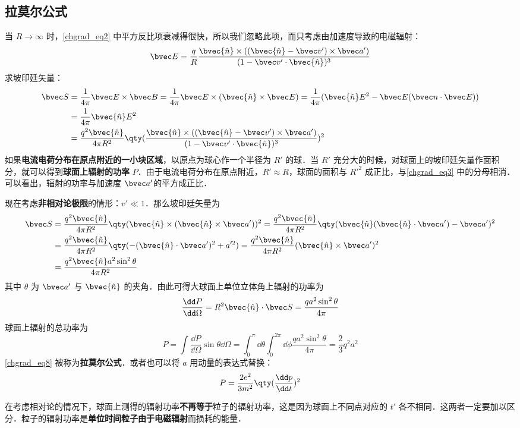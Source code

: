 \subsection{拉莫尔公式}
当 $R\rightarrow \infty$ 时，\autoref{chgrad_eq2} 中平方反比项衰减得很快，所以我们忽略此项，而只考虑由加速度导致的电磁辐射：
\begin{equation}
\bvec E=\frac{q}{R}\frac{\bvec{\hat n}\times ((\bvec{\hat n}-\bvec v')\times \bvec a')}{(1-\bvec v'\cdot \bvec{\hat n})^3}
\end{equation}
求坡印廷矢量：
\begin{equation}\label{chgrad_eq3}
\begin{aligned}
\bvec S&=\frac{1}{4\pi}\bvec E\times \bvec B=\frac{1}{4\pi}\bvec E\times (\bvec{\hat n}\times \bvec E)=\frac{1}{4\pi}(\bvec{\hat n}E^2-\bvec E(\bvec n\cdot \bvec E))\\
&=\frac{1}{4\pi}\bvec {\hat n}E^2\\
&=\frac{q^2\bvec{\hat n}}{4\pi R^2}\qty(\frac{\bvec{\hat n}\times ((\bvec{\hat n}-\bvec v')\times \bvec a')}{(1-\bvec v'\cdot \bvec{\hat n})^3})^2
\end{aligned}
\end{equation}
如果\textbf{电流电荷分布在原点附近的一小块区域}，以原点为球心作一个半径为 $R'$ 的球．当 $R'$ 充分大的时候，对球面上的坡印廷矢量作面积分，就可以得到\textbf{球面上辐射的功率} $P$．由于电流电荷分布在原点附近，$R'\approx R$，球面的面积与 $R'^2$ 成正比，与\autoref{chgrad_eq3} 中的分母相消．可以看出，辐射的功率与加速度 $\bvec a'$的平方成正比．

现在考虑\textbf{非相对论极限}的情形：$v'\ll 1$．那么坡印廷矢量为
\begin{equation}
\begin{aligned}
\bvec S&=\frac{q^2\bvec{\hat n}}{4\pi R^2}\qty(\bvec{\hat n}\times (\bvec{\hat n}\times \bvec a'))^2=\frac{q^2\bvec{\hat n}}{4\pi R^2}\qty(\bvec {\hat n}(\bvec{\hat n}\cdot \bvec a')-\bvec a')^2\\
&=\frac{q^2\bvec{\hat n}}{4\pi R^2}\qty( -(\bvec{\hat n}\cdot \bvec a')^2+a'^2 )=\frac{q^2\bvec{\hat n}}{4\pi R^2}(\bvec{\hat n}\times \bvec a')^2\\
&=\frac{q^2\bvec{\hat n}a^2\sin^2\theta}{4\pi R^2}
\end{aligned}
\end{equation}
其中 $\theta$ 为 $\bvec a'$ 与 $\bvec{\hat n}$ 的夹角．由此可得大球面上单位立体角上辐射的功率为
\begin{equation}
\frac{\dd P}{\dd \Omega}=R^2\bvec{\hat n}\cdot \bvec S=\frac{qa^2\sin^2\theta}{4\pi}
\end{equation}
球面上辐射的总功率为
\begin{equation}\label{chgrad_eq8}
P=\int \frac{\dd P}{\dd \Omega} \sin \theta\dd \Omega=\int_0^\pi\dd \theta\int_0^{2\pi} \dd \phi \frac{qa^2\sin^2\theta}{4\pi}=\frac{2}{3}q^2a^2
\end{equation}
\autoref{chgrad_eq8} 被称为\textbf{拉莫尔公式}．或者也可以将 $a$ 用动量的表达式替换：
\begin{equation}
P=\frac{2e^2}{3m^2}\qty(\frac{\dd p}{\dd t})^2
\end{equation}

在考虑相对论的情况下，球面上测得的辐射功率\textbf{不再等于}粒子的辐射功率，这是因为球面上不同点对应的 $t'$ 各不相同．这两者一定要加以区分．粒子的辐射功率是\textbf{单位时间粒子由于电磁辐射}而损耗的能量．